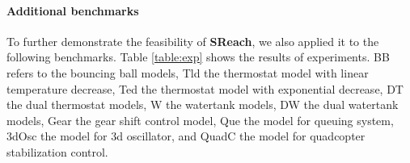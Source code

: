 \begin{comment}

\subsection{Application to the stabilization control of quadcopters}

\textit{Model Description}.
We modeled the stabilization control of a quadcopter, and are interested in analyzing its robustness. In other words, given an arbitrary initial location and position, this model will guarantee that the quadcopter will soon become stable via adjusting velocities of four rotors. To specify the arbitrary initial status, we introduced 6 random variables: ($x_0$, $y_0$, $z_0$) (the initial location),  $\phi_0$ (the initial roll angle), $\theta_0$ (the initial pitch angle), and $\psi_0$ (the initial yaw angle).

\textit{Experiments and Results}. To validate this model, {\bf SReach} was adopted with the BIFT statistical testing option.  

\end{comment}


\paragraph{\bf Additional benchmarks}
To further demonstrate the feasibility of {\bf SReach}, we also applied it to the following benchmarks. 
Table \ref{table:exp} shows the results of experiments. BB refers to the bouncing ball models, 
Tld the thermostat model with linear temperature decrease, Ted the thermostat model with exponential decrease, 
DT the dual thermostat models, W the watertank models, DW the dual watertank models, Gear the gear shift control 
model, Que the model for queuing system, 3dOsc the model for 3d oscillator, and QuadC the model for quadcopter 
stabilization control. 

